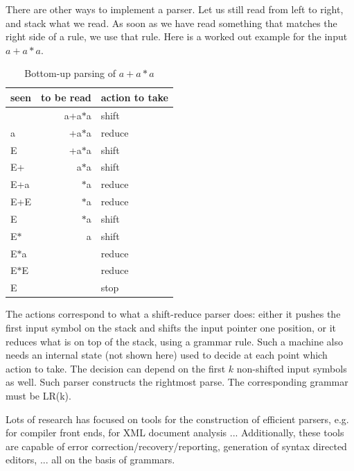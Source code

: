 There are other ways to implement a parser. Let us still read from
left to right, and stack what we read. As soon as we have read
something that matches the right side of a rule, we use that
rule. Here is a worked out example for the input $a+a*a$.


\begin{table}[ht]
\center
\begin{tabular}{|l|r|l|}
\hline
seen       & to be read      & action to take \\ \hline
           & a+a$*$a           & shift    \\
   a       &  +a$*$a           & reduce   \\
   E       &  +a$*$a           & shift    \\
   E+      &  a$*$a            & shift    \\
   E+a     &   $*$a            & reduce   \\
   E+E     &  $*$a             & reduce   \\
   E       &  $*$a             & shift    \\
   E$*$      &   a             & shift    \\
   E$*$a     &                 & reduce   \\
   E$*$E     &                 & reduce   \\
   E       &                 & stop   \\
\hline
\end{tabular}
\caption{Bottom-up parsing of $a+a*a$} \label{bottomup}
\end{table}
The actions correspond to what a shift-reduce parser does: either it
pushes the first input symbol on the stack and shifts the input
pointer one position, or it reduces what is on top of the stack, using
a grammar rule. Such a machine also needs an internal state (not shown
here) used to decide at each point which action to take. The decision
can depend on the first $k$ non-shifted input symbols as well. Such
parser constructs the rightmost parse. The corresponding grammar must
be LR(k).

Lots of research has focused on tools for the construction of
efficient parsers, e.g. for compiler front ends, for XML document
analysis ... Additionally, these tools are capable of error
correction/recovery/reporting, generation of syntax directed editors,
...  all on the basis of grammars.




